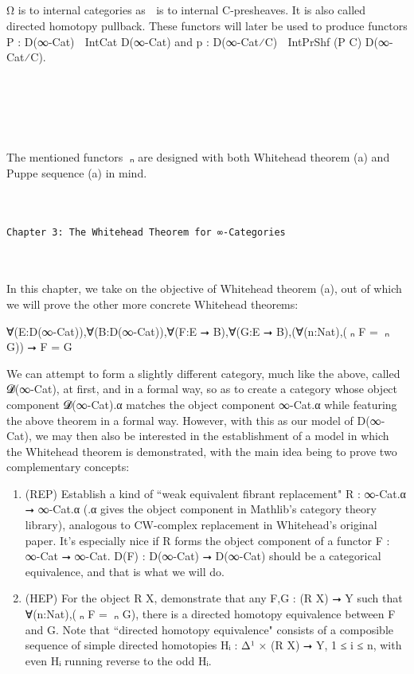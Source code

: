 \documentclass{book}
\theoremstyle{definition}
\newcounter{pcounter}
\newcounter{sectioncount}
\newcounter{subsectioncount}
\renewcommand{\section}[1]{\newpage\ \\ \ \\ \begin{center} \scalebox{1.5}{\texttt{\thesectioncount . #1}} \stepcounter{sectioncount} \setcounter{subsectioncount}{1} \end{center} \begin{center} \ \\ \ \\ \thispagestyle{empty} \end{center}}
\renewcommand{\chapter}[1]{
\newpage
{
\Huge 
\begin{center}
\ \\
\ \\
\thispagestyle{empty}
\texttt{#1}
\end{center}}
\ \\
\ \\
}
\begin{document}
\section{ω⃗}

Ω⃗ is to internal categories as ω⃗ is to internal C-presheaves. It is also called directed homotopy pullback. These functors will later be used to produce functors P⃗ : D(∞-Cat) ⭢ IntCat D(∞-Cat) and p⃗ : D(∞-Cat⁄C) ⭢ IntPrShf (P⃗ C) D(∞-Cat⁄C).\\


\section{π⃗ₙ}

The mentioned functors π⃗ₙ are designed with both Whitehead theorem (a) and Puppe sequence (a) in mind.



\chapter{Chapter 3: The Whitehead Theorem for ∞-Categories}

In this chapter, we take on the objective of Whitehead theorem (a), out of which we will prove the other more concrete Whitehead theorems:\\

\begin{center} ∀(E:D(∞-Cat)),∀(B:D(∞-Cat)),∀(F:E ⭢ B),∀(G:E ⭢ B),(∀(n:Nat),(π⃗ₙ F = π⃗ₙ G)) ⭢ F = G
\end{center}

We can attempt to form a slightly different category, much like the above, called 𝓓(∞-Cat), at first, and in a formal way, so as to create a category whose object component 𝓓(∞-Cat).α matches the object component ∞-Cat.α while featuring the above theorem in a formal way. However, with this as our model of D(∞-Cat), we may then also be interested in the establishment of a model in which the Whitehead theorem is demonstrated, with the main idea being to prove two complementary concepts:

\begin{enumerate}
\item (REP) Establish a kind of ``weak equivalent fibrant replacement" R : ∞-Cat.α ⭢ ∞-Cat.α (.α gives the object component in Mathlib's category theory library), analogous to CW-complex replacement in Whitehead's original paper. It's especially nice if R forms the object component of a functor F : ∞-Cat ⭢ ∞-Cat. D(F) : D(∞-Cat) ⭢ D(∞-Cat) should be a categorical equivalence, and that is what we will do.
\item (HEP) For the object R X, demonstrate that any F,G : (R X) ⭢ Y such that ∀(n:Nat),(π⃗ₙ F = π⃗ₙ G), there is a directed homotopy equivalence between F and G. Note that ``directed homotopy equivalence" consists of a composible sequence of simple directed homotopies Hᵢ : Δ¹ × (R X) ⭢ Y, 1 ≤ i ≤ n, with even Hᵢ running reverse to the odd Hᵢ.
\end{enumerate} 
\end{document}
